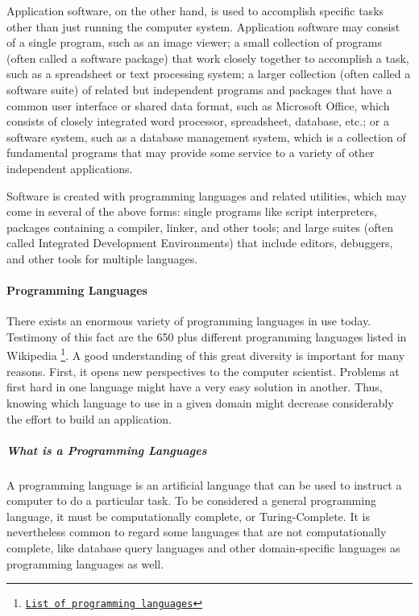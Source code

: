 Application software, on the other hand, is used to accomplish specific tasks other than just running the computer system. Application software may consist of a single program, such as an image viewer; a small collection of programs (often called a software package) that work closely together to accomplish a task, such as a spreadsheet or text processing system; a larger collection (often called a software suite) of related but independent programs and packages that have a common user interface or shared data format, such as Microsoft Office, which consists of closely integrated word processor, spreadsheet, database, etc.; or a software system, such as a database management system, which is a collection of fundamental programs that may provide some service to a variety of other independent applications.

Software is created with programming languages and related utilities, which may come in several of the above forms: single programs like script interpreters, packages containing a compiler, linker, and other tools; and large suites (often called Integrated Development Environments) that include editors, debuggers, and other tools for multiple languages. 


\paragraph*{Programming Languages}
\hfill \break
There exists an enormous variety of programming languages in use today. Testimony of this fact are the 650 plus different programming languages listed in Wikipedia \footnote{\href{http://en.wikipedia.org/wiki/List_of_programming_languages}{\texttt{List of programming languages}}}. A good understanding of this great diversity is important for many reasons. First, it opens new perspectives to the computer scientist. Problems at first hard in one language might have a very easy solution in another. Thus, knowing which language to use in a given domain might decrease considerably the effort to build an application.


\subparagraph*{What is a Programming Languages}
\hfill \break
A programming language is an artificial language that can be used to instruct a computer to do a particular task. To be considered a general programming language, it must be computationally complete, or Turing-Complete. It is nevertheless common to regard some languages that are not computationally complete, like database query languages and other domain-specific languages as programming languages as well.

